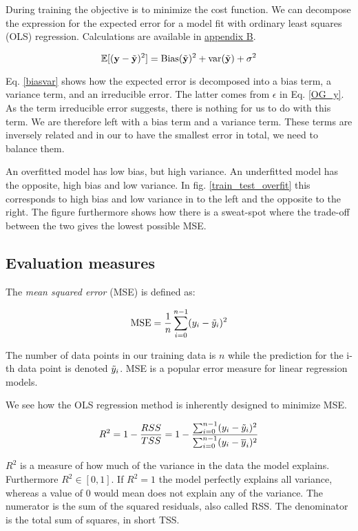 During training the objective is to minimize the cost function.  We can decompose the expression for the expected error for a model fit with ordinary least squares (OLS) regression. Calculations are available in \hyperref[appendixB]{appendix B}.

\begin{equation}\label{biasvar}
    \mathbb{E}[(\mathbf{y} - \Tilde{\mathbf{y}})^2] = \text{Bias}(\Tilde{\mathbf{y}})^2 + \text{var}(\Tilde{\mathbf{y}}) + \sigma^2
\end{equation}

Eq. \ref{biasvar} shows how the expected error is decomposed into a bias term, a variance term, and an irreducible error. The latter comes from $\epsilon$ in Eq. \ref{OG_y}. As the term irreducible error suggests, there is nothing for us to do with this term. We are therefore left with a bias term and a variance term. These terms are inversely related and in our to have the smallest error in total, we need to balance them. 

An overfitted model has low bias, but high variance. An underfitted model has the opposite, high bias and low variance. In fig. \ref{train_test_overfit} this corresponds to high bias and low variance in to the left and the opposite to the right. The figure furthermore shows how there is a sweat-spot where the trade-off between the two gives the lowest possible MSE.


\subsection{Evaluation measures}

The \emph{mean squared error} (MSE) is defined as: 

\begin{equation}\label{mse}
    \text{MSE} = \frac{1}{n}\sum_{i=0}^{n-1}(y_i-\Tilde{y}_i)^2
\end{equation}

The number of data points in our training data is $n$ while the prediction for the i-th data point is denoted $\Tilde{y}_i$. MSE is a popular error measure for linear regression models. 

We see how the OLS regression method is inherently designed to minimize MSE.

\begin{equation}
    R^2 = 1 - \frac{RSS}{TSS}= 1 - \frac{\sum_{i=0}^{n-1}(y_i-\Tilde{y}_i)^2}{\sum_{i=0}^{n-1}(y_i-\overline{y}_i)^2}
\end{equation}

$R^2$ is a measure of how much of the variance in the data the model explains. %
Furthermore $R^2 \in [0,1]$. If $R^2 = 1$ the model perfectly explains all variance, whereas a value of 0 would mean does not explain any of the variance. The numerator is the sum of the squared residuals, also called RSS. The denominator is the total sum of squares, in short TSS. 

